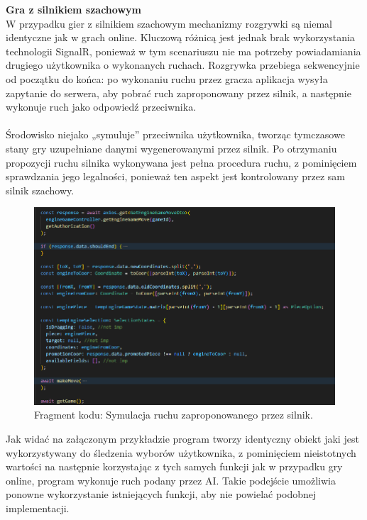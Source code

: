 \documentclass[12pt,a4paper]{article}
\begin{document}
\newpage

\noindent \textbf{Gra z silnikiem szachowym}\\
W przypadku gier z silnikiem szachowym mechanizmy rozgrywki są niemal identyczne jak w grach online. Kluczową różnicą jest jednak brak wykorzystania technologii SignalR, ponieważ w tym scenariuszu nie ma potrzeby powiadamiania drugiego użytkownika o wykonanych ruchach. Rozgrywka przebiega sekwencyjnie od początku do końca: po wykonaniu ruchu przez gracza aplikacja wysyła zapytanie do serwera, aby pobrać ruch zaproponowany przez silnik, a następnie wykonuje ruch jako odpowiedź przeciwnika.
\\\\
Środowisko niejako „symuluje” przeciwnika użytkownika, tworząc tymczasowe stany gry uzupełniane danymi wygenerowanymi przez silnik. Po otrzymaniu propozycji ruchu silnika wykonywana jest pełna procedura ruchu, z pominięciem sprawdzania jego legalności, ponieważ ten aspekt jest kontrolowany przez sam silnik szachowy.

\vspace{0.5cm}
\begin{figure}[h!]
    \centering
    \includegraphics[width=1\textwidth]{images/ex_engine_move_sim.png}
    \caption{Fragment kodu: Symulacja ruchu zaproponowanego przez silnik.}
\end{figure}
\vspace{0.5cm}

\noindent
Jak widać na załączonym przykładzie program tworzy identyczny obiekt jaki jest wykorzystywany do śledzenia wyborów użytkownika, z pominięciem nieistotnych wartości na następnie korzystając z tych samych funkcji jak w przypadku gry online, program wykonuje ruch podany przez AI. Takie podejście umożliwia ponowne wykorzystanie istniejących funkcji, aby nie powielać podobnej implementacji.
\end{document}
